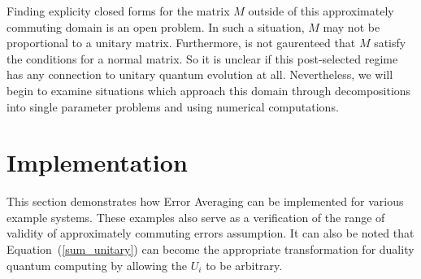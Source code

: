\documentclass[aps,pra,twocolumn,superscriptaddress,numerical]{revtex4-1}
\begin{document}



Finding explicity closed forms for the matrix $M$ outside of this approximately commuting domain is an open problem.  In such a situation, $M$ may not be proportional to a unitary matrix.  Furthermore, is not gaurenteed that $M$ satisfy the conditions for a normal matrix.  So it is unclear if this post-selected regime has any connection to unitary quantum evolution at all.  Nevertheless, we will begin to examine situations which approach this domain through decompositions into single parameter problems and using numerical computations.

\section{Implementation\label{implementation}}

This section demonstrates how Error Averaging can be implemented for various example systems. These examples also serve as a verification of the range of validity of approximately commuting errors assumption. It can also be noted that Equation~(\ref{sum_unitary}) can become the appropriate transformation for duality quantum computing by allowing the $U_{i}$ to be arbitrary\cite{dualityQC}.
\end{document}
